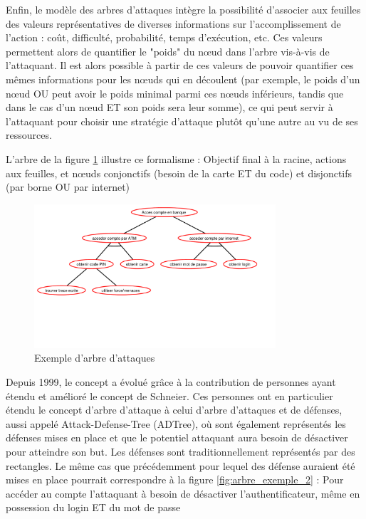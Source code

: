         Enfin, le modèle des arbres d'attaques intègre la possibilité d'associer aux feuilles des valeurs représentatives de diverses informations sur l'accomplissement de l'action : coût, difficulté, probabilité, temps d'exécution, etc. Ces valeurs permettent alors de quantifier le "poids" du nœud dans l'arbre vis-à-vis de l'attaquant.  Il est alors possible à partir de ces valeurs de pouvoir quantifier ces mêmes informations pour les nœuds qui en découlent (par exemple, le poids d'un nœud OU peut avoir le poids minimal parmi ces nœuds inférieurs, tandis que dans le cas d'un nœud ET son poids sera leur somme), ce qui peut servir à l'attaquant pour choisir une stratégie d'attaque plutôt qu'une autre au vu de ses ressources.

		L'arbre de la figure \ref{fig:arbre_exemple_1} illustre ce formalisme : Objectif final à la racine, actions aux feuilles, et nœuds conjonctifs (besoin de la carte ET du code) et disjonctifs (par borne OU par internet) 

		\begin{figure}
			\begin{center}
				\includegraphics[width=0.8\textwidth]{figure/exemple1_rapport.pdf}
			\end{center}
			\caption{Exemple d'arbre d'attaques}
			\label{fig:arbre_exemple_1}
		\end{figure}

		Depuis 1999, le concept a évolué grâce à la contribution de personnes ayant étendu et amélioré le concept de Schneier. 
        Ces personnes ont en particulier étendu le concept d'arbre d'attaque à celui d'arbre d'attaques et de défenses, aussi appelé Attack-Defense-Tree (ADTree), où sont également représentés les défenses mises en place et que le potentiel attaquant aura besoin de désactiver pour atteindre son but. Les défenses sont traditionnellement représentés par des rectangles. Le même cas que précédemment pour lequel des défense auraient été mises en place pourrait correspondre à la figure \ref{fig:arbre_exemple_2} : Pour accéder au compte l'attaquant à besoin de désactiver l'authentificateur, même en possession du login ET du mot de passe

